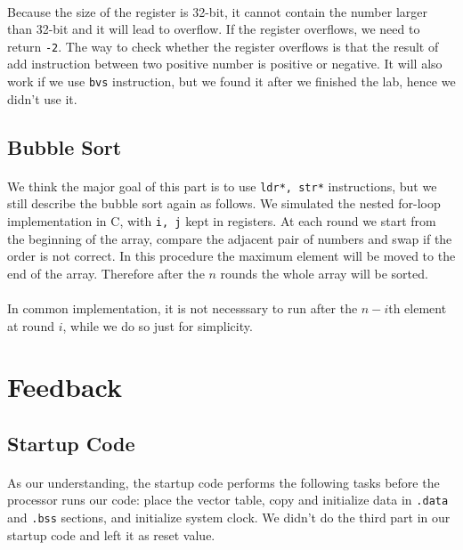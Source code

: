 \paragraph{}
Because the size of the register is 32-bit, it cannot contain the number larger than 32-bit and it will lead to overflow. If the register overflows, we need to return \texttt{-2}. The way to check whether the register overflows is that the result of add instruction between two positive number is positive or negative.
It will also work if we use \texttt{bvs} instruction, but we found it after we finished the lab, hence we didn't use it.


\subsection{Bubble Sort}
\paragraph{}
We think the major goal of this part is to use \texttt{ldr*, str*} instructions, but we still describe the bubble sort again as follows.
We simulated the nested for-loop implementation in C, with \texttt{i, j} kept in registers. At each round we start from the beginning of the array, compare the adjacent pair of numbers and swap if the order is not correct. In this procedure the maximum element will be moved to the end of the array. Therefore after the $n$ rounds the whole array will be sorted.
\paragraph{}
In common implementation, it is not necesssary to run after the $n-i$th element at round $i$, while we do so just for simplicity.
\section{Feedback}
\subsection{Startup Code}
\paragraph{}
As our understanding, the startup code performs the following tasks before the processor runs our code: 
place the vector table, copy and initialize data in \texttt{.data} and \texttt{.bss} sections, and initialize system clock. 
We didn't do the third part in our startup code and left it as reset value.

